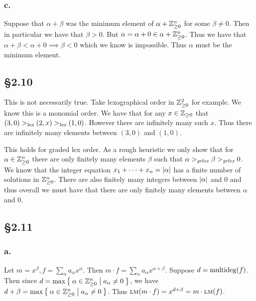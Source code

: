 \documentclass[letterpaper]{article}
\begin{document}
\subsubsection*{c.}

Suppose that $\alpha + \beta$ was the minimum element of $\alpha + \mathbb{Z}_{\geq 0}^{n}$ for some $\beta \neq 0$. Then in particular we have that $\beta > 0$. But $\alpha = \alpha + 0 \in \alpha + \mathbb{Z}_{\geq 0}^{n}$. Thus we have that $\alpha + \beta < \alpha + 0 \implies \beta < 0$ which we know is impossible. Thus $\alpha$ must be the minimum element.

\subsection*{\S 2.10}

This is not necessarily true. Take lexographical order in $\mathbb{Z}_{\geq 0}^{2}$ for example. We know this is a monomial order. We have that for any $x \in \mathbb{Z}_{\geq 0}$ that $(3, 0) >_{\emph{lex}} (2, x)  >_{\emph{lex}} (1, 0)$. However there are infinitely many such $x$. Thus there are infinitely many elements between $(3, 0)$ and $(1, 0)$.

This holds for graded lex order. As a rough heuristic we only show that for $\alpha \in \mathbb{Z}_{\geq 0}^{n}$ there are only finitely many elements $\beta$ such that $\alpha >_{\emph{grlex}} \beta >_{\emph{grlex}} 0$. We know that the integer equation $x_{1} + \cdots + x_{n} = \abs{\alpha}$ has a finite number of solutions in $\mathbb{Z}_{\geq 0}^{n}$. There are also finitely many integers between $\abs{\alpha}$ and $0$ and thus overall we must have that there are only finitely many elements between $\alpha$ and $0$.


\subsection*{\S 2.11}

\subsubsection*{a.}

Let $m = x^{\beta}, f = \sum_{\alpha} a_{\alpha}x^{\alpha}$.
Then $m \cdot f = \sum_{\alpha} a_{\alpha} x^{\alpha + \beta}$.
Suppose $d = \operatorname{multideg}(f)$.
Then since $d = \max\Set{\alpha \in \mathbb{Z}_{\geq 0}^{n} | a_{\alpha} \neq 0}$, we have $d + \beta = \max\Set{\alpha \in \mathbb{Z}_{\geq 0}^{n} | a_{\alpha} \neq 0}$.
Thus $\operatorname{\textsc{lm}}(m \cdot f) = x^{d + \beta} = m \cdot \operatorname{\textsc{lm}}(f)$.
\end{document}
